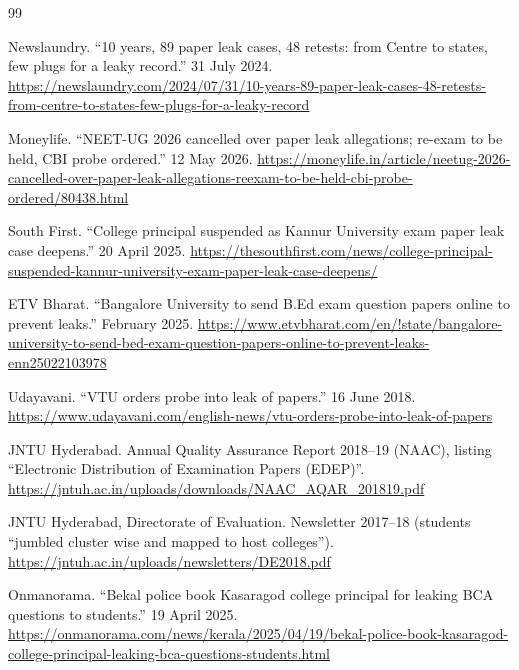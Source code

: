 \documentclass[10pt,a4paper]{article}
\theoremstyle{remark}
\begin{document}
\FloatBarrier
\small
\begin{thebibliography}{99}

 Newslaundry. \enquote{10 years, 89 paper leak cases, 48 retests: from Centre to states, few plugs for a leaky record.} 31 July 2024. \url{https://newslaundry.com/2024/07/31/10-years-89-paper-leak-cases-48-retests-from-centre-to-states-few-plugs-for-a-leaky-record}

 Moneylife. \enquote{NEET-UG 2026 cancelled over paper leak allegations; re-exam to be held, CBI probe ordered.} 12 May 2026. \url{https://moneylife.in/article/neetug-2026-cancelled-over-paper-leak-allegations-reexam-to-be-held-cbi-probe-ordered/80438.html}

 South First. \enquote{College principal suspended as Kannur University exam paper leak case deepens.} 20 April 2025. \url{https://thesouthfirst.com/news/college-principal-suspended-kannur-university-exam-paper-leak-case-deepens/}

 ETV Bharat. \enquote{Bangalore University to send B.Ed exam question papers online to prevent leaks.} February 2025. \url{https://www.etvbharat.com/en/!state/bangalore-university-to-send-bed-exam-question-papers-online-to-prevent-leaks-enn25022103978}

 Udayavani. \enquote{VTU orders probe into leak of papers.} 16 June 2018. \url{https://www.udayavani.com/english-news/vtu-orders-probe-into-leak-of-papers}

 JNTU Hyderabad. Annual Quality Assurance Report 2018--19 (NAAC), listing \enquote{Electronic Distribution of Examination Papers (EDEP)}. \url{https://jntuh.ac.in/uploads/downloads/NAAC_AQAR_201819.pdf}

 JNTU Hyderabad, Directorate of Evaluation. Newsletter 2017--18 (students \enquote{jumbled cluster wise and mapped to host colleges}). \url{https://jntuh.ac.in/uploads/newsletters/DE2018.pdf}

 Onmanorama. \enquote{Bekal police book Kasaragod college principal for leaking BCA questions to students.} 19 April 2025. \url{https://onmanorama.com/news/kerala/2025/04/19/bekal-police-book-kasaragod-college-principal-leaking-bca-questions-students.html}


\end{thebibliography}
\end{document}
